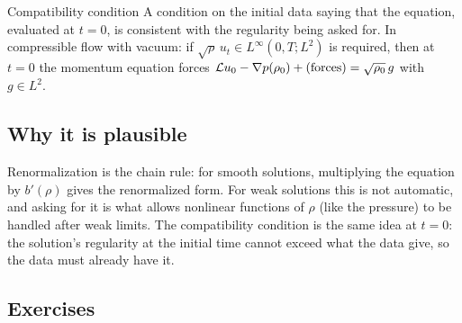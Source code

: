 \begin{defnbox}{Compatibility condition}
%
A condition on the initial data saying that the equation, evaluated at $t=0$, is consistent with the regularity being asked for. In compressible flow with vacuum: if $\sqrt\rho\,u_t\in L^\infty(0,T;L^2)$ is required, then at $t=0$ the momentum equation forces $\mathcal{L} u_0-\nabla p(\rho_0)+(\text{forces}) = \sqrt{\rho_0}\,g$ with $g\in L^2$.
\end{defnbox}

\subsection*{Why it is plausible}

Renormalization is the chain rule: for smooth solutions, multiplying the equation by $b'(\rho)$ gives the renormalized form. For weak solutions this is not automatic, and asking for it is what allows nonlinear functions of $\rho$ (like the pressure) to be handled after weak limits. The compatibility condition is the same idea at $t=0$: the solution's regularity at the initial time cannot exceed what the data give, so the data must already have it.

\subsection*{Exercises}

